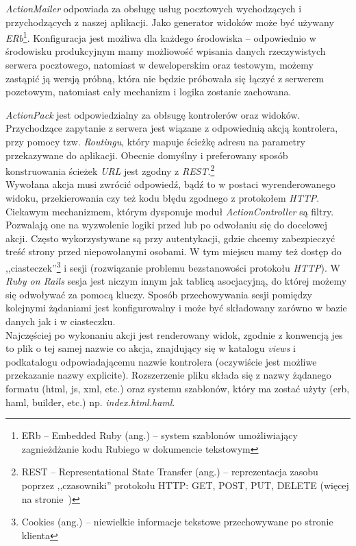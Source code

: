 \documentclass[a4paper,12pt]{article}
\begin{document}
\emph{ActionMailer} odpowiada za obsługę usług pocztowych wychodzących i przychodzących z
naszej aplikacji. Jako generator widoków może być używany \emph{ERb}\footnote{ERb --
Embedded Ruby (ang.) -- system szablonów umożliwiający zagnieżdżanie kodu Rubiego w
dokumencie tekstowym}. Konfiguracja jest możliwa dla każdego środowiska -- odpowiednio w
środowisku produkcyjnym mamy możliowość wpisania danych rzeczywistych serwera pocztowego,
natomiast w deweloperskim oraz testowym, możemy zastąpić ją wersją próbną, która nie
będzie próbowała się łączyć z serwerem pozctowym, natomiast cały mechanizm i logika
zostanie zachowana.


\emph{ActionPack} jest odpowiedzialny za obłsugę kontrolerów oraz widoków. Przychodzące
zapytanie z serwera jest wiązane z odpowiednią akcją kontrolera, przy pomocy tzw.
\emph{Routingu}, który mapuje ścieżkę adresu na parametry przekazywane do aplikacji.
Obecnie domyślny i preferowany sposób konstruowania ścieżek \emph{URL} jest zgodny z
\emph{REST}.\footnote{REST -- Representational State Transfer (ang.) -- reprezentacja zasobu
poprzez ,,czasowniki'' protokołu HTTP: GET, POST, PUT, DELETE (więcej na stronie~\pageref{sec:rest})}\\
Wywołana akcja musi zwrócić odpowiedź, bądź to w postaci wyrenderowanego widoku,
przekierowania czy też kodu błędu zgodnego z protokołem \emph{HTTP}. Ciekawym mechanizmem,
którym dysponuje moduł \emph{ActionController} są filtry. Pozwalają one na wyzwolenie
logiki przed lub po odwołaniu się do docelowej akcji. Często wykorzystywane są przy
autentykacji, gdzie chcemy zabezpieczyć treść strony przed niepowołanymi osobami. W tym
miejscu mamy też dostęp do ,,ciasteczek''\footnote{Cookies (ang.) -- niewielkie informacje
tekstowe przechowywane po stronie klienta} i sesji (rozwiązanie problemu bezstanowości
protokołu \emph{HTTP}). W \emph{Ruby on Rails} sesja jest niczym innym jak tablicą
asocjacyjną, do której możemy się odwoływać za pomocą kluczy. Sposób
przechowywania sesji pomiędzy kolejnymi żądaniami jest konfigurowalny i może być
składowany zarówno w bazie danych jak i w ciasteczku.\\
Najczęściej po wykonaniu akcji jest renderowany widok, zgodnie z konwencją jes to plik o
tej samej nazwie co akcja, znajdujący się w katalogu \emph{views} i podkatalogu
odpowiadającemu nazwie kontrolera (oczywiście jest możliwe przekazanie nazwy explicite).
Rozszerzenie pliku składa się z nazwy żądanego formatu (html, js, xml, etc.) oraz systemu
szablonów, który ma zostać użyty (erb, haml, builder, etc.) np. \emph{index.html.haml}.
\end{document}
